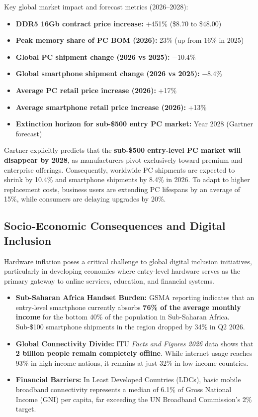 \documentclass[11pt,a4paper]{article}
\begin{document}
	Key global market impact and forecast metrics (2026--2028):
	
	\begin{itemize}
 	 \item \textbf{DDR5 16Gb contract price increase:} +451\% (\$8.70 to \$48.00)
  	\item \textbf{Peak memory share of PC BOM (2026):} 23\% (up from 16\% in
        2025)
 	 \item \textbf{Global PC shipment change (2026 vs 2025):} $-10.4\%$
 	 \item \textbf{Global smartphone shipment change (2026 vs 2025):} $-8.4\%$
  	\item \textbf{Average PC retail price increase (2026):} +17\%
  	\item \textbf{Average smartphone retail price increase (2026):} +13\%
  	\item \textbf{Extinction horizon for sub-\$500 entry PC market:} Year 2028
        (Gartner forecast)
	\end{itemize}

	Gartner explicitly predicts that the \textbf{sub-\$500 entry-level PC market
	will disappear by 2028}, as manufacturers pivot exclusively toward premium and
	enterprise offerings. Consequently, worldwide PC shipments are expected to
	shrink by 10.4\% and smartphone shipments by 8.4\% in 2026. To adapt to higher
	replacement costs, business users are extending PC lifespans by an average of
	15\%, while consumers are delaying upgrades by 20\%.

	\subsection{Socio-Economic Consequences and Digital Inclusion}
	Hardware inflation poses a critical challenge to global digital inclusion
	initiatives, particularly in developing economies where entry-level hardware
	serves as the primary gateway to online services, education, and financial
	systems.
	
	\begin{itemize}
  	\item \textbf{Sub-Saharan Africa Handset Burden:} GSMA reporting indicates
        that an entry-level smartphone currently absorbs \textbf{76\% of the
        average monthly income} for the bottom 40\% of the population in
        Sub-Saharan Africa. Sub-\$100 smartphone shipments in the region
        dropped by 34\% in Q2 2026.
  	\item \textbf{Global Connectivity Divide:} ITU \textit{Facts and Figures
        2026} data shows that \textbf{2 billion people remain completely
        offline}. While internet usage reaches 93\% in high-income nations, it
        remains at just 32\% in low-income countries.
 	 \item \textbf{Financial Barriers:} In Least Developed Countries (LDCs),
        basic mobile broadband connectivity represents a median of 6.1\% of
        Gross National Income (GNI) per capita, far exceeding the UN Broadband
        Commission's 2\% target.
	\end{itemize}
\end{document}
